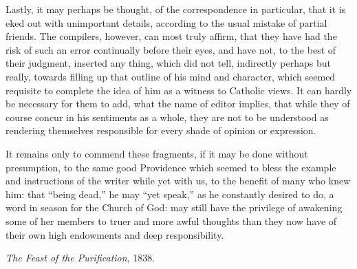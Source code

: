 Lastly, it may perhaps be
thought, of the correspondence in particular, that it is eked out with
unimportant details, according to the usual mistake of partial
friends. The compilers, however, can most truly affirm, that they have
had the risk of such an error continually before their eyes,
and have not, to the best of their judgment, inserted any thing, which
did not tell, indirectly perhaps but really, towards filling up that
outline of his mind and character, which seemed requisite to complete
the idea of him as a witness to Catholic views. It can hardly be
necessary for them to add, what the name of editor implies, that while
they of course concur in his sentiments as a whole, they are not to be
understood as rendering themselves responsible for every shade of
opinion or expression.

It remains only to commend
these fragments, if it may be done without presumption, to the same
good Providence which seemed to bless the example and instructions of
the writer while yet with us, to the benefit of many who knew him:
that ``being dead,'' he may ``yet speak,'' as he constantly desired to do,
a word in season for the Church of God: may still have the privilege
of awakening some of her members to truer and more awful thoughts than
they now have of their own high endowments and deep responsibility.

\emph{The Feast of the
Purification}, 1838.
